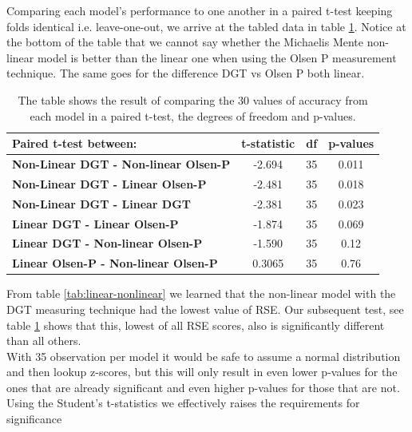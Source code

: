 \documentclass{article}
\begin{document}
Comparing each model's performance to one another in a paired t-test keeping folds identical i.e. leave-one-out, we arrive at the tabled data in table \ref{tab:BAPcompare}. Notice at the bottom of the table that we cannot say whether the Michaelis Mente non-linear model is better than the linear one when using the Olsen P measurement technique. The same goes for the difference DGT vs Olsen P both linear.

\begin{table}[]
\begin{tabular}{lccc}\toprule[1.5pt]
\textbf{Paired t-test between:}                          & \multicolumn{1}{l}{\textbf{t-statistic}} & \multicolumn{1}{l}{\textbf{df}} & \multicolumn{1}{l}{\textbf{p-values}} \\\midrule
\textbf{Non-Linear DGT - Non-linear Olsen-P} & -2.694                                   & 35                              & 0.011                                 \\\midrule
\textbf{Non-Linear DGT - Linear Olsen-P}     & -2.481                                   & 35                              & 0.018                                 \\\midrule
\textbf{Non-Linear DGT - Linear DGT}         & -2.381                                   & 35                              & 0.023                                 \\\midrule
\textbf{Linear DGT - Linear Olsen-P}         & -1.874                                   & 35                              & 0.069                                 \\\midrule
\textbf{Linear DGT - Non-linear Olsen-P}     & -1.590                                   & 35                              & 0.12                                  \\\midrule
\textbf{Linear Olsen-P - Non-linear Olsen-P} & 0.3065                                   & 35                              & 0.76                      \\
\bottomrule[1.25pt]           
\end{tabular}
\label{tab:BAPcompare}
\caption{The table shows the result of comparing the 30 values of accuracy from each model in a paired t-test, the degrees of freedom and p-values.}
\end{table}


From table \ref{tab:linear-nonlinear} we learned that the non-linear model with the DGT measuring technique had the lowest value of RSE. Our subsequent test, see table \ref{tab:BAPcompare} shows that this, lowest of all RSE scores, also is significantly different than all others. \\
With 35 observation per model it would be safe to assume a normal distribution and then lookup z-scores, but this will only result in even lower p-values for the ones that are already significant and even higher p-values for those that are not. Using the Student's t-statistics we effectively raises the requirements for significance	
\end{document}
